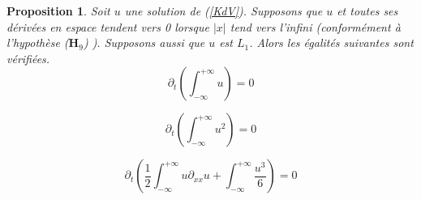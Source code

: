 \documentclass[12pt,a4paper]{article}
\newtheorem{prop}[dfn]{\textbf{Proposition}}
\numberwithin{equation}{section}
\begin{document}
\begin{prop}
    Soit $u$ une solution de (\ref{KdV}). Supposons que $u$ et toutes ses dérivées en espace tendent vers 0 lorsque $|x|$ tend vers l'infini (conformément à l'hypothèse ($\textbf{H}_9$) ). Supposons aussi que $u$ est $L_1$. Alors les égalités suivantes sont vérifiées.
    \begin{equation}
        \partial_t\left(\int_{-\infty}^{+\infty}u\right) = 0
    \end{equation}
    
    \begin{equation}
        \partial_t\left(\int_{-\infty}^{+\infty}u^2\right) = 0
    \end{equation}

    \begin{equation}
        \partial_t\left(\frac{1}{2}\int_{-\infty}^{+\infty}u\partial_{xx}u + \int_{-\infty}^{+\infty}\frac{u^3}{6}\right) = 0
    \end{equation}
\end{prop}
\end{document}
